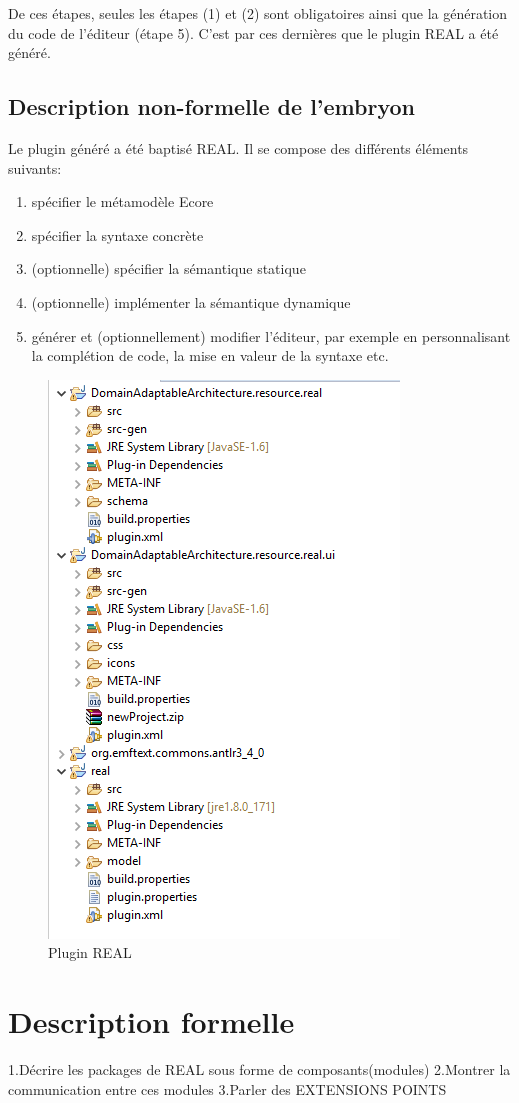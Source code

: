 De ces étapes, seules les étapes (1) et (2) sont obligatoires ainsi que la génération du code de l'éditeur (étape 5). C'est par ces dernières que le plugin REAL a été généré. 
\subsection{Description non-formelle de l'embryon}
Le plugin généré a été baptisé REAL. Il se compose des différents éléments suivants:
\begin{enumerate}
	\item spécifier le métamodèle Ecore
	\item spécifier la syntaxe concrète
	\item (optionnelle) spécifier la sémantique statique 
	\item (optionnelle) implémenter la sémantique dynamique 
	\item générer et (optionnellement) modifier l'éditeur, par exemple en personnalisant la complétion de code, la mise en valeur de la syntaxe etc.
\end{enumerate}
\begin{figure}[h!]
  \includegraphics[scale=0.9]{images/real.png}
  \caption{Plugin REAL}
  \label{fig:plugin_real}
\end{figure}
\section{Description formelle}
1.Décrire les packages de REAL sous forme de composants(modules)
2.Montrer la communication entre ces modules
3.Parler des EXTENSIONS POINTS


